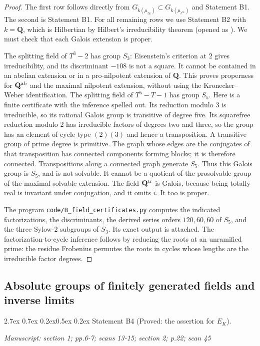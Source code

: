 \documentclass[11pt,a4paper]{article}
\makeatletter
\newcommand{\passage}[1]{\par\smallskip\noindent\textit{Manuscript: #1}\par\smallskip}
\renewcommand\paragraph{\@startsection{paragraph}{4}{\z@}%
  {2.7ex \@plus 0.7ex \@minus 0.2ex}{0.5ex \@plus 0.2ex}%
  {\normalfont\normalsize\bfseries}}
\makeatother
\begin{document}
\begin{proof}
The first row follows directly from
$G_{k(\mu_\infty)}\subset G_{k(\mu_{\ell^\infty})}$ and Statement B1.
The second is Statement B1. For all remaining rows we use Statement B2
with $k=\mathbf Q$, which is Hilbertian by Hilbert's irreducibility theorem
(opened as \cite[\S4, Theorem 1]{B_Geyer2012}). We must check that each
Galois extension is proper.

The splitting field of $T^3-2$ has group $S_3$: Eisenstein's criterion at
$2$ gives irreducibility, and its discriminant $-108$ is not a square.
It cannot be contained in an abelian extension or in a pro-nilpotent
extension of $\mathbf Q$. This proves properness for $\mathbf Q^{\rm ab}$
and the maximal nilpotent extension, without using the Kronecker--Weber
identification. The splitting field of $T^5-T-1$ has group $S_5$.
Here is a finite certificate with the inference spelled out. Its reduction
modulo $3$ is irreducible, so its rational Galois group is transitive of
degree five. Its squarefree reduction modulo $2$ has irreducible factors
of degrees two and three, so the group has an element of cycle type
$(2)(3)$ and hence a transposition. A transitive group of prime degree is
primitive. The graph whose edges are the conjugates of that transposition
has connected components forming blocks; it is therefore connected.
Transpositions along a connected graph generate $S_5$.
Thus this Galois group is $S_5$, and is not solvable. It cannot be a quotient
of the prosolvable group of the maximal solvable extension. The field
$\mathbf Q^{\rm tr}$ is Galois, because being totally real is invariant
under conjugation, and it omits $i$. It too is proper.

The program \texttt{code/B\_field\_certificates.py} computes the indicated
factorizations, the discriminants, the derived series orders
$120,60,60$ of $S_5$, and the three Sylow-$2$ subgroups of $S_3$.
Its exact output is attached. The factorization-to-cycle inference follows
by reducing the roots at an unramified prime: the residue Frobenius permutes
the roots in cycles whose lengths are the irreducible factor degrees.
\end{proof}

\subsection{Absolute groups of finitely generated fields and inverse limits}

\paragraph{Statement B4 (Proved: the assertion for $E_K$).}\label{res:B4}
\passage{section 1; pp.6-7; scans 13-15; section 2; p.22; scan 45}
\end{document}
